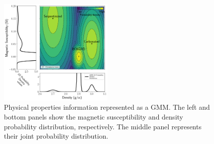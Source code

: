 \begin{figure}
    \begin{center}
    \includegraphics[width=0.5\textwidth]{figures/synthetic-GMM.png}
    \end{center}
\caption{
    Physical properties information represented as a GMM. The left and bottom panels show the magnetic susceptibility and density probability distribution, respectively. The middle panel represents their joint probability distribution.
}
\label{fig:synthetic-gmm}
\end{figure}
